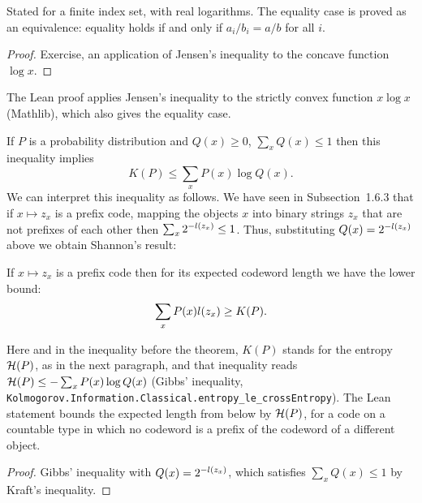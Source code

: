 \begin{formalization}
Stated for a finite index set, with real logarithms. The equality case is proved as an
equivalence: equality holds if and only if \( a_{i}/b_{i} = a/b \) for all \( i \).
\end{formalization}

\begin{proof}
  \leanok
Exercise, an application of Jensen's inequality to the
concave function \( \log x \).
\end{proof}

\begin{formalization}
The Lean proof applies Jensen's inequality to the strictly convex function \( x \log x \)
(Mathlib), which also gives the equality case.
\end{formalization}

If \( P \) is a probability distribution and \( Q(x) \ge 0 \), 
\( \sum_{x} Q(x) \le 1 \) then this inequality implies
 \[
   K(P) \le \sum_{x} P(x) \log Q(x).
 \]
We can interpret this inequality as follows.
We have seen in Subsection~1.6.3 that if
\( x \mapsto z_{x} \) is a prefix code, mapping the objects \( x \) into binary
strings \( z_{x} \) that are not prefixes of each other then
\( \sum_{x} 2^{-l(z_{x})} \le 1 \).
Thus, substituting \( Q(x) = 2^{-l(z_{x})} \) above we obtain Shannon's result:

 \begin{theorem}[Shannon]\label{thm:Shannon-coding-lb}
  \leanok
If \( x \mapsto z_{x} \) is a prefix code then for its expected codeword length
we have the lower bound:
 \[
   \sum_{x} P(x) l(z_{x}) \ge K(P).
 \]
 \end{theorem}

\begin{formalization}
Here and in the inequality before the theorem, \( K(P) \) stands for the entropy
\( \mathcal{H}(P) \), as in the next paragraph, and that inequality reads
\( \mathcal{H}(P) \le -\sum_{x} P(x) \log Q(x) \) (Gibbs' inequality,
\texttt{Kolmogorov.Information.Classical.entropy\_le\_crossEntropy}). The Lean statement
bounds the expected length from below by \( \mathcal{H}(P) \), for a code on a countable type in which
no codeword is a prefix of the codeword of a different object.
\end{formalization}

\begin{proof}
  \leanok
Gibbs' inequality with \( Q(x) = 2^{-l(z_{x})} \), which satisfies
\( \sum_{x} Q(x) \le 1 \) by Kraft's inequality.
\end{proof}


